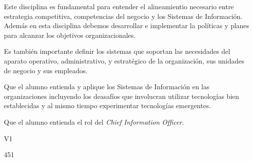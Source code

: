 \begin{syllabus}


\begin{justification}
Este disciplina es fundamental para entender el alineamientio necesario entre estrategia competitiva, competencias del negocio y los Sistemas de Información. Además en esta disciplina debemos desarrollar e implementar la políticas y planes para alcanzar los objetivos organizacionales.

Es también importante definir los sistemas que soportan las necesidades del aparato operativo, administrativo, y estratégico de la organización, sus unidades de negocio y sus empleados.
\end{justification}

\begin{goals}
\item Que el alumno entienda y aplique los Sistemas de Información en las organizaciones incluyendo los deasafíos que involucran utilizar tecnologías bien establecidas y al mismo tiempo experimentar tecnologías emergentes.
\item Que el alumno entienda el rol del \textit{Chief Information Officer}.
\end{goals}

\begin{outcomes}{V1}
\end{outcomes}

\begin{unit}{\LUTWOONEOHDef}{}{\LUTWOONEOHBib}{45}{1}
   \begin{topics}
		\item \OMCONETopicTWOxONExFOUR
		\item \OMCONETopicTWOxONExFIVE
		\item \OMCTWOTopicTWOxTWOxFIVE
		\item \OMCTWOTopicTWOxTWOxONE
		\item \TDSSEVENTopicTHREExSEVENxFIVE
		\item \TDSONEOHTopicTHREExONEOHxEIGHT
		\item \OMCTWOTopicTWOxTWOxFOUR
   \end{topics}
	\LUTWOONEOHGoal
\end{unit}


\end{syllabus}
